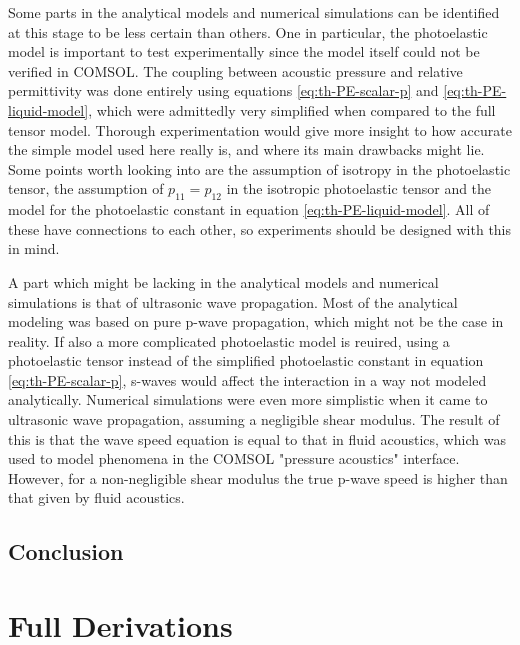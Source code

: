 \documentclass[11pt,twoside]{eitExjobb}
\begin{document}
	Some parts in the analytical models and numerical simulations can be identified at this stage to be less certain than others. One in particular, the photoelastic model is important to test experimentally since the model itself could not be verified in COMSOL. The coupling between acoustic pressure and relative permittivity was done entirely using equations \eqref{eq:th-PE-scalar-p} and \eqref{eq:th-PE-liquid-model}, which were admittedly very simplified when compared to the full tensor model. Thorough experimentation would give more insight to how accurate the simple model used here really is, and where its main drawbacks might lie. Some points worth looking into are the assumption of isotropy in the photoelastic tensor, the assumption of $p_{11} = p_{12}$ in the isotropic photoelastic tensor and the model for the photoelastic constant in equation \eqref{eq:th-PE-liquid-model}. All of these have connections to each other, so experiments should be designed with this in mind.
	
	A part which might be lacking in the analytical models and numerical simulations is that of ultrasonic wave propagation. Most of the analytical modeling was based on pure p-wave propagation, which might not be the case in reality. If also a more complicated photoelastic model is reuired, using a photoelastic tensor instead of the simplified photoelastic constant in equation \eqref{eq:th-PE-scalar-p}, s-waves would affect the interaction in a way not modeled analytically. Numerical simulations were even more simplistic when it came to ultrasonic wave propagation, assuming a negligible shear modulus. The result of this is that the wave speed equation is equal to that in fluid acoustics, which was used to model phenomena in the COMSOL "pressure acoustics" interface. However, for a non-negligible shear modulus the true p-wave speed is higher than that given by fluid acoustics. 
	
	\section{Conclusion}
	
	
	
	
	
	\appendix
	
	\chapter{Full Derivations}
	
\end{document}
